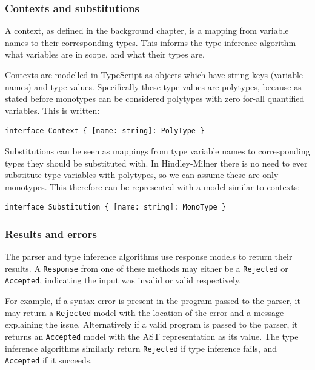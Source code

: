 \documentclass[a4paper,fleqn,oneside,12pt]{report}
\begin{document}
\subsubsection{Contexts and substitutions}\label{id:h.ux3btyb2wvh8}

A context, as defined in the background chapter, is a mapping from variable names to their corresponding types. This informs the type inference algorithm what variables are in scope, and what their types are.

Contexts are modelled in TypeScript as objects which have string keys (variable names) and type values. Specifically these type values are polytypes, because as stated before monotypes can be considered polytypes with zero for-all quantified variables. This is written:

\begin{verbatim}
interface Context { [name: string]: PolyType }
\end{verbatim}
Substitutions can be seen as mappings from type variable names to corresponding types they should be substituted with. In Hindley-Milner there is no need to ever substitute type variables with polytypes, so we can assume these are only monotypes. This therefore can be represented with a model similar to contexts:

\begin{verbatim}
interface Substitution { [name: string]: MonoType }
\end{verbatim}

\subsubsection{Results and errors}\label{id:h.5yk2zijb0axq}

The parser and type inference algorithms use response models to return their results. A \texttt{Response} from one of these methods may either be a \texttt{Rejected} or \texttt{Accepted}, indicating the input was invalid or valid respectively.

For example, if a syntax error is present in the program passed to the parser, it may return a \texttt{Rejected} model with the location of the error and a message explaining the issue. Alternatively if a valid program is passed to the parser, it returns an \texttt{Accepted} model with the AST representation as its value. The type inference algorithms similarly return \texttt{Rejected} if type inference fails, and \texttt{Accepted} if it succeeds.
\end{document}
